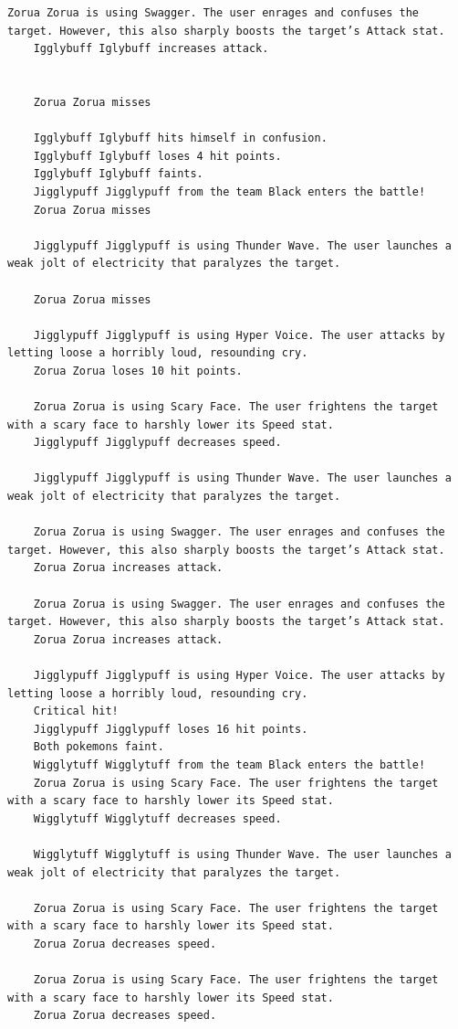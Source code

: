 \begin{lstlisting}[caption={Результат выполнения программы},label={lst:result}]
    Zorua Zorua is using Swagger. The user enrages and confuses the target. However, this also sharply boosts the target’s Attack stat.
    Igglybuff Iglybuff increases attack.


    Zorua Zorua misses

    Igglybuff Iglybuff hits himself in confusion.
    Igglybuff Iglybuff loses 4 hit points.
    Igglybuff Iglybuff faints.
    Jigglypuff Jigglypuff from the team Black enters the battle!
    Zorua Zorua misses

    Jigglypuff Jigglypuff is using Thunder Wave. The user launches a weak jolt of electricity that paralyzes the target.

    Zorua Zorua misses

    Jigglypuff Jigglypuff is using Hyper Voice. The user attacks by letting loose a horribly loud, resounding cry.
    Zorua Zorua loses 10 hit points.

    Zorua Zorua is using Scary Face. The user frightens the target with a scary face to harshly lower its Speed stat.
    Jigglypuff Jigglypuff decreases speed.

    Jigglypuff Jigglypuff is using Thunder Wave. The user launches a weak jolt of electricity that paralyzes the target.

    Zorua Zorua is using Swagger. The user enrages and confuses the target. However, this also sharply boosts the target’s Attack stat.
    Zorua Zorua increases attack.

    Zorua Zorua is using Swagger. The user enrages and confuses the target. However, this also sharply boosts the target’s Attack stat.
    Zorua Zorua increases attack.

    Jigglypuff Jigglypuff is using Hyper Voice. The user attacks by letting loose a horribly loud, resounding cry.
    Critical hit!
    Jigglypuff Jigglypuff loses 16 hit points.
    Both pokemons faint.
    Wigglytuff Wigglytuff from the team Black enters the battle!
    Zorua Zorua is using Scary Face. The user frightens the target with a scary face to harshly lower its Speed stat.
    Wigglytuff Wigglytuff decreases speed.

    Wigglytuff Wigglytuff is using Thunder Wave. The user launches a weak jolt of electricity that paralyzes the target.

    Zorua Zorua is using Scary Face. The user frightens the target with a scary face to harshly lower its Speed stat.
    Zorua Zorua decreases speed.

    Zorua Zorua is using Scary Face. The user frightens the target with a scary face to harshly lower its Speed stat.
    Zorua Zorua decreases speed.


\end{lstlisting}
